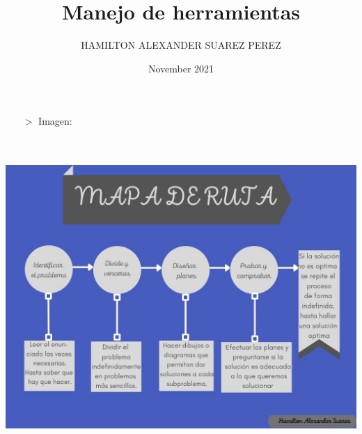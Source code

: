 \documentclass{article}
\title{Manejo de herramientas}
\author{HAMILTON ALEXANDER  SUAREZ PEREZ}
\date{November 2021}
\begin{document}
\maketitle

\centering
\begin{itemize}
    \item[$>$]  Imagen:
\end{itemize}
\\
\\
\includegraphics[scale=0.5]{Imagen.jpg}
\end{document}
